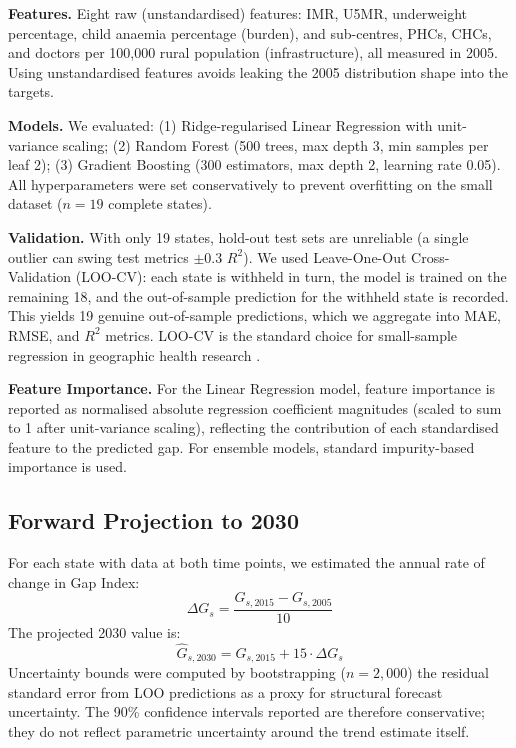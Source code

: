 \documentclass[conference]{IEEEtran}
\begin{document}
\textbf{Features.} Eight raw (unstandardised) features: IMR, U5MR,
underweight percentage, child anaemia percentage (burden), and
sub-centres, PHCs, CHCs, and doctors per 100,000 rural population
(infrastructure), all measured in 2005. Using unstandardised features
avoids leaking the 2005 distribution shape into the targets.

\textbf{Models.} We evaluated: (1) Ridge-regularised Linear Regression
with unit-variance scaling; (2) Random Forest (500 trees, max depth 3,
min samples per leaf 2); (3) Gradient Boosting (300 estimators, max
depth 2, learning rate 0.05). All hyperparameters were set conservatively
to prevent overfitting on the small dataset ($n=19$ complete states).

\textbf{Validation.} With only 19 states, hold-out test sets are
unreliable (a single outlier can swing test metrics $\pm$0.3 $R^2$).
We used Leave-One-Out Cross-Validation (LOO-CV): each state is withheld
in turn, the model is trained on the remaining 18, and the
out-of-sample prediction for the withheld state is recorded. This
yields 19 genuine out-of-sample predictions, which we aggregate into
MAE, RMSE, and $R^2$ metrics. LOO-CV is the standard choice for
small-sample regression in geographic health research \cite{James2013}.

\textbf{Feature Importance.} For the Linear Regression model, feature
importance is reported as normalised absolute regression coefficient
magnitudes (scaled to sum to 1 after unit-variance scaling), reflecting
the contribution of each standardised feature to the predicted gap.
For ensemble models, standard impurity-based importance is used.

\subsection{Forward Projection to 2030}

For each state with data at both time points, we estimated the annual
rate of change in Gap Index:
\begin{equation}
\Delta G_s = \frac{G_{s,2015} - G_{s,2005}}{10}
\end{equation}
The projected 2030 value is:
\begin{equation}
\hat{G}_{s,2030} = G_{s,2015} + 15 \cdot \Delta G_s
\end{equation}
Uncertainty bounds were computed by bootstrapping ($n=2{,}000$) the
residual standard error from LOO predictions as a proxy for structural
forecast uncertainty. The 90\% confidence intervals reported are
therefore conservative; they do not reflect parametric uncertainty
around the trend estimate itself.
\end{document}
